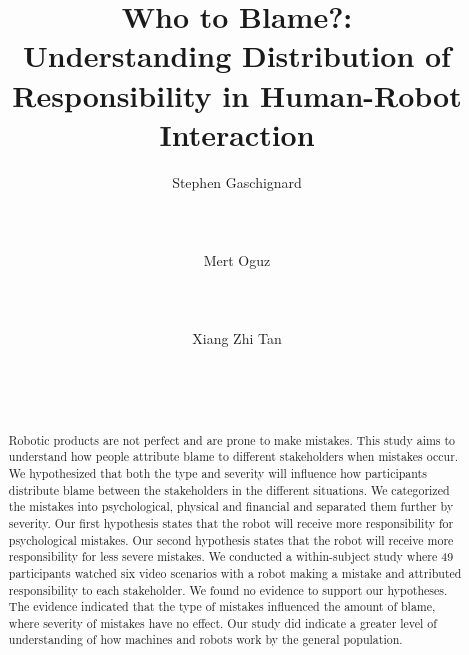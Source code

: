 \documentclass{sigchi}
\begin{document}
\title{Who to Blame?:\\ Understanding Distribution of Responsibility in Human-Robot Interaction}

\author{
  \alignauthor  Stephen Gaschignard\\
    \\
    \\
    \\
  \alignauthor Mert Oguz\\
    \\
    \\
    \\    
  \alignauthor Xiang Zhi Tan\\
    \\
    \\
    \\
}

\maketitle

\begin{abstract}
Robotic products are not perfect and are prone to make mistakes. This study aims to understand how people attribute blame to different stakeholders when mistakes occur. We hypothesized that both the type and severity will influence how participants distribute blame between the stakeholders in the different situations. We categorized the mistakes into psychological, physical and financial and separated them further by severity. Our first hypothesis states that the robot will receive more responsibility for psychological mistakes. Our second hypothesis states that the robot will receive more responsibility for less severe mistakes. We conducted a within-subject study where 49 participants watched six video scenarios with a robot making a mistake and attributed responsibility to each stakeholder. We found no evidence to support our hypotheses. The evidence indicated that the type of mistakes influenced the amount of blame, where severity of mistakes have no effect. Our study did indicate a greater level of understanding of how machines and robots work by the general population.
\end{abstract}
\end{document}
